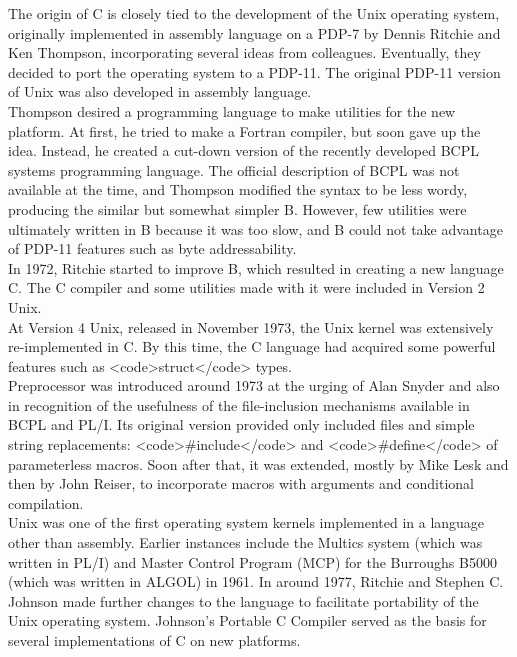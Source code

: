\documentclass{article}\usepackage{titlesec}
\begin{document}
The origin of C is closely tied to the development of the Unix operating system, originally implemented in assembly language on a PDP-7 by Dennis Ritchie and Ken Thompson, incorporating several ideas from colleagues.  Eventually, they decided to port the operating system to a PDP-11. The original PDP-11 version of Unix was also developed in assembly language.
\\
Thompson desired a programming language to make utilities for the new platform. At first, he tried to make a Fortran compiler, but soon gave up the idea. Instead, he created a cut-down version of the recently developed BCPL systems programming language. The official description of BCPL was not available at the time, and Thompson modified the syntax to be less wordy, producing the similar but somewhat simpler B. However, few utilities were ultimately written in B because it was too slow, and B could not take advantage of PDP-11 features such as byte addressability.
\\
In 1972, Ritchie started to improve B, which resulted in creating a new language C. The C compiler and some utilities made with it were included in Version 2 Unix.
\\
At Version 4 Unix, released in November 1973, the Unix kernel was extensively re-implemented in C. By this time, the C language had acquired some powerful features such as <code>struct</code> types.
\\
Preprocessor was introduced around 1973 at the urging of Alan Snyder and also in recognition of the usefulness of the file-inclusion mechanisms available in BCPL and PL/I. Its original version provided only included files and simple string replacements: <code>\#include</code> and <code>\#define</code> of parameterless macros. Soon after that, it was extended, mostly by Mike Lesk and then by John Reiser, to incorporate macros with arguments and conditional compilation.
\\
Unix was one of the first operating system kernels implemented in a language other than assembly. Earlier instances include the Multics system (which was written in PL/I) and Master Control Program (MCP) for the Burroughs B5000 (which was written in ALGOL) in 1961. In around  1977, Ritchie and Stephen C. Johnson made further changes to the language to facilitate portability of the Unix operating system.  Johnson's Portable C Compiler served as the basis for several implementations of C on new platforms.
\\
\end{document}
